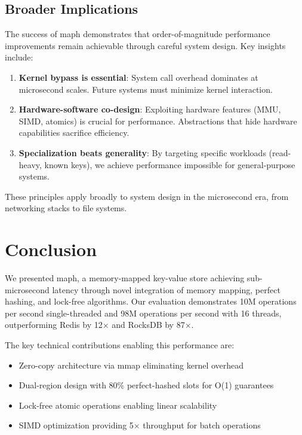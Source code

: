 \documentclass[10pt,conference]{IEEEtran}
\begin{document}
\subsection{Broader Implications}

The success of maph demonstrates that order-of-magnitude performance improvements remain achievable through careful system design. Key insights include:

\begin{enumerate}
\item \textbf{Kernel bypass is essential}: System call overhead dominates at microsecond scales. Future systems must minimize kernel interaction.

\item \textbf{Hardware-software co-design}: Exploiting hardware features (MMU, SIMD, atomics) is crucial for performance. Abstractions that hide hardware capabilities sacrifice efficiency.

\item \textbf{Specialization beats generality}: By targeting specific workloads (read-heavy, known keys), we achieve performance impossible for general-purpose systems.
\end{enumerate}

These principles apply broadly to system design in the microsecond era, from networking stacks to file systems.

\section{Conclusion}
\label{sec:conclusion}

We presented maph, a memory-mapped key-value store achieving sub-microsecond latency through novel integration of memory mapping, perfect hashing, and lock-free algorithms. Our evaluation demonstrates 10M operations per second single-threaded and 98M operations per second with 16 threads, outperforming Redis by 12$\times$ and RocksDB by 87$\times$.

The key technical contributions enabling this performance are:
\begin{itemize}
\item Zero-copy architecture via mmap eliminating kernel overhead
\item Dual-region design with 80\% perfect-hashed slots for O(1) guarantees
\item Lock-free atomic operations enabling linear scalability
\item SIMD optimization providing 5$\times$ throughput for batch operations
\end{itemize}
\end{document}
